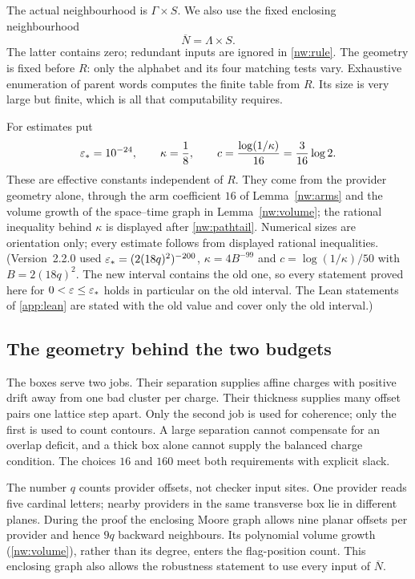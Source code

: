 The actual neighbourhood is $\Gamma\times S$. We also use the fixed enclosing neighbourhood
\begin{equation}\label{nw:neighbourhood}
 \overline N=\Lambda\times S.
\end{equation}
The latter contains zero; redundant inputs are ignored in \eqref{nw:rule}. The geometry is fixed before $R$: only the alphabet and its four matching tests vary. Exhaustive enumeration of parent words computes the finite table from $R$. Its size is very large but finite, which is all that computability requires.

For estimates put
\begin{equation}\label{nw:constants}
  \varepsilon_*=10^{-24},\qquad \kappa=\frac18,\qquad
  c=\frac{\log(1/\kappa)}{16}=\frac{3}{16}\log 2 .
\end{equation}
These are effective constants independent of $R$. They come from the provider geometry alone,
through the arm coefficient $16$ of Lemma~\ref{nw:arms} and the volume growth of the space--time
graph in Lemma~\ref{nw:volume}; the rational inequality behind $\kappa$ is displayed after
\eqref{nw:pathtail}. Numerical sizes are orientation only; every estimate follows from displayed
rational inequalities. (Version~2.2.0 used $\varepsilon_*=(2(18q)^2)^{-200}$, $\kappa=4B^{-99}$ and
$c=\log(1/\kappa)/50$ with $B=2(18q)^2$. The new interval contains the old one, so every
statement proved here for $0<\varepsilon\le\varepsilon_*$ holds in particular on the old interval.
The Lean statements of \cref{app:lean} are stated with the old value and cover only the old interval.)

\subsection{The geometry behind the two budgets}

The boxes serve two jobs. Their separation supplies affine charges with positive drift away from one bad cluster per charge. Their thickness supplies many offset pairs one lattice step apart. Only the second job is used for coherence; only the first is used to count contours. A large separation cannot compensate for an overlap deficit, and a thick box alone cannot supply the balanced charge condition. The choices $16$ and $160$ meet both requirements with explicit slack.

The number $q$ counts provider offsets, not checker input sites. One provider reads five cardinal letters; nearby providers in the same transverse box lie in different planes. During the proof the enclosing Moore graph allows nine planar offsets per provider and hence $9q$ backward neighbours. Its polynomial volume growth (\cref{nw:volume}), rather than its degree, enters the flag-position count. This enclosing graph also allows the robustness statement to use every input of $\overline N$.

